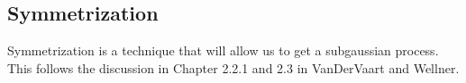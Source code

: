 \subsection{Symmetrization}%
\label{subsec:symmetrization}

Symmetrization is a technique that will allow us to get a subgaussian process. This follows the discussion in Chapter 2.2.1 and 2.3 in VanDerVaart and Wellner.


